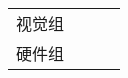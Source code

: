 \begin{longtable}{ X | X | X | X |}
        \multirow{3}{*}{视觉组} &
        &
        &
        \\

    

        &
        &
        &
        \\

        &
        &
        &
        \\
        
    \hline

        \multirow{3}{*}{硬件组} &
        &
        &
        \\

        &
        &
        &
        \\

        &
        &
        &
        \\
    
\end{longtable}

